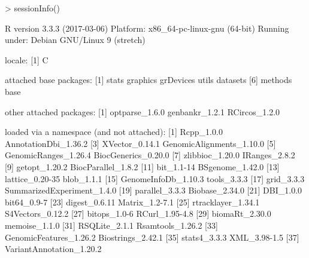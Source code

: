 \documentclass[letterpaper]{article}
\begin{document}
\begin{Schunk}
\begin{Sinput}
> sessionInfo()
\end{Sinput}
\begin{Soutput}
R version 3.3.3 (2017-03-06)
Platform: x86_64-pc-linux-gnu (64-bit)
Running under: Debian GNU/Linux 9 (stretch)

locale:
[1] C

attached base packages:
[1] stats     graphics  grDevices utils     datasets 
[6] methods   base     

other attached packages:
[1] optparse_1.6.0 genbankr_1.2.1 RCircos_1.2.0 

loaded via a namespace (and not attached):
 [1] Rcpp_1.0.0                 AnnotationDbi_1.36.2      
 [3] XVector_0.14.1             GenomicAlignments_1.10.0  
 [5] GenomicRanges_1.26.4       BiocGenerics_0.20.0       
 [7] zlibbioc_1.20.0            IRanges_2.8.2             
 [9] getopt_1.20.2              BiocParallel_1.8.2        
[11] bit_1.1-14                 BSgenome_1.42.0           
[13] lattice_0.20-35            blob_1.1.1                
[15] GenomeInfoDb_1.10.3        tools_3.3.3               
[17] grid_3.3.3                 SummarizedExperiment_1.4.0
[19] parallel_3.3.3             Biobase_2.34.0            
[21] DBI_1.0.0                  bit64_0.9-7               
[23] digest_0.6.11              Matrix_1.2-7.1            
[25] rtracklayer_1.34.1         S4Vectors_0.12.2          
[27] bitops_1.0-6               RCurl_1.95-4.8            
[29] biomaRt_2.30.0             memoise_1.1.0             
[31] RSQLite_2.1.1              Rsamtools_1.26.2          
[33] GenomicFeatures_1.26.2     Biostrings_2.42.1         
[35] stats4_3.3.3               XML_3.98-1.5              
[37] VariantAnnotation_1.20.2  
\end{Soutput}
\end{Schunk}
\end{document}

